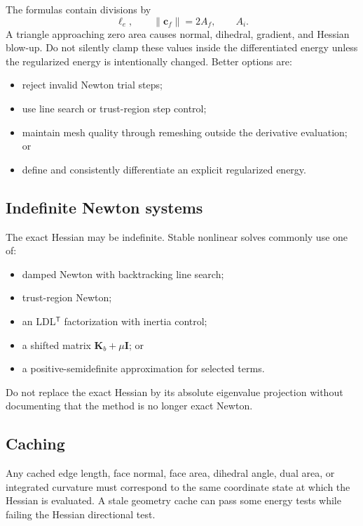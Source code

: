 \documentclass[11pt]{article}
\newcommand{\T}{\mathsf{T}}
\newcommand{\Id}{\mathbf{I}}
\newcommand{\Kmat}{\mathbf{K}}
\begin{document}
The formulas contain divisions by
\begin{equation}
  \ell_e,
  \qquad
  \|\mathbf{c}_f\|=2A_f,
  \qquad
  A_i.
\end{equation}
A triangle approaching zero area causes normal, dihedral, gradient, and Hessian blow-up.  Do not silently clamp these values inside the differentiated energy unless the regularized energy is intentionally changed.  Better options are:
\begin{itemize}
  \item reject invalid Newton trial steps;
  \item use line search or trust-region step control;
  \item maintain mesh quality through remeshing outside the derivative evaluation; or
  \item define and consistently differentiate an explicit regularized energy.
\end{itemize}

\subsection{Indefinite Newton systems}

The exact Hessian may be indefinite.  Stable nonlinear solves commonly use one of:
\begin{itemize}
  \item damped Newton with backtracking line search;
  \item trust-region Newton;
  \item an LDL$^\T$ factorization with inertia control;
  \item a shifted matrix $\Kmat_b+\mu\Id$; or
  \item a positive-semidefinite approximation for selected terms.
\end{itemize}
Do not replace the exact Hessian by its absolute eigenvalue projection without documenting that the method is no longer exact Newton.

\subsection{Caching}

Any cached edge length, face normal, face area, dihedral angle, dual area, or integrated curvature must correspond to the same coordinate state at which the Hessian is evaluated.  A stale geometry cache can pass some energy tests while failing the Hessian directional test.
\end{document}
